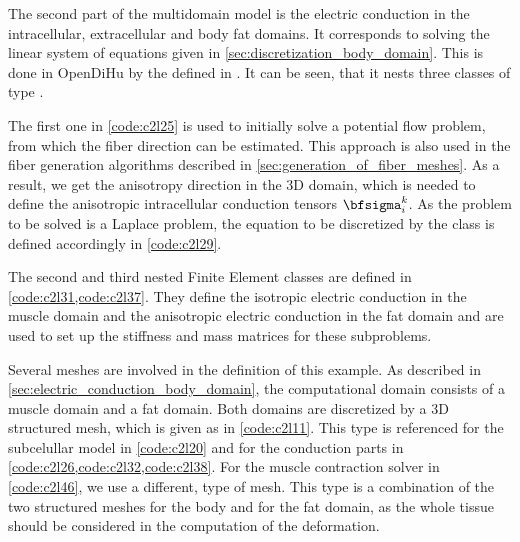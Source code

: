 The second part of the multidomain model is the electric conduction in the intracellular, extracellular and body fat domains. It corresponds to solving the linear system of equations given in \cref{sec:discretization_body_domain}. This is done in OpenDiHu by the  defined in . It can be seen, that it nests three classes of type . 

The first one in \cref{code:c2l25} is used to initially solve a potential flow problem, from which the fiber direction can be estimated. This approach \cite{Choi2013} is also used in the fiber generation algorithms described in \cref{sec:generation_of_fiber_meshes}. As a result, we get the anisotropy direction in the 3D domain, which is needed to define the anisotropic intracellular conduction tensors $\bfsigma_i^k$. As the problem to be solved is a Laplace problem, the equation to be discretized by the class is defined accordingly in \cref{code:c2l29}.

The second and third nested Finite Element classes are defined in \cref{code:c2l31,code:c2l37}. They define the isotropic electric conduction in the muscle domain and the anisotropic electric conduction in the fat domain and are used to set up the stiffness and mass matrices for these subproblems.

Several meshes are involved in the definition of this example. As described in \cref{sec:electric_conduction_body_domain}, the computational domain consists of a muscle domain and a fat domain. Both domains are discretized by a 3D structured mesh, which is given as  in \cref{code:c2l11}. This type is referenced for the subcelullar model in \cref{code:c2l20} and for the conduction parts in \cref{code:c2l26,code:c2l32,code:c2l38}. 
For the muscle contraction solver in \cref{code:c2l46}, we use a different,  type of mesh. This type is a combination of the two structured meshes for the body and for the fat domain, as the whole tissue should be considered in the computation of the deformation.

